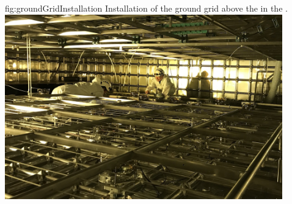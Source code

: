 \begin{dunefigure}{fig:groundGridInstallation}
{Installation of the ground grid above the  in the .}
\includegraphics[width=0.9\textwidth]{graphics/groundGridInstallation.jpg}
\end{dunefigure}

